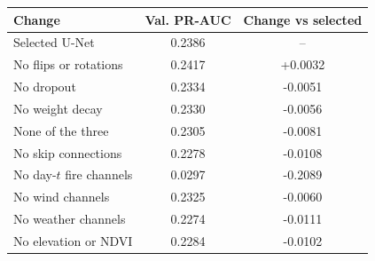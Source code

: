 \begin{tabular}{lcc}
\toprule
Change & Val. PR-AUC & Change vs selected \\
\midrule
Selected U-Net & 0.2386 & -- \\
No flips or rotations & 0.2417 & +0.0032 \\
No dropout & 0.2334 & -0.0051 \\
No weight decay & 0.2330 & -0.0056 \\
None of the three & 0.2305 & -0.0081 \\
No skip connections & 0.2278 & -0.0108 \\
No day-$t$ fire channels & 0.0297 & -0.2089 \\
No wind channels & 0.2325 & -0.0060 \\
No weather channels & 0.2274 & -0.0111 \\
No elevation or NDVI & 0.2284 & -0.0102 \\
\bottomrule
\end{tabular}
